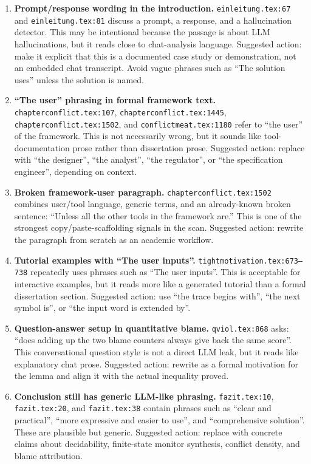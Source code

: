 \documentclass[11pt,a4paper]{article}
\newcommand{\loc}[1]{\texttt{#1}}
\newcommand{\sev}[1]{\textbf{#1}}
\begin{document}
\begin{enumerate}
  \item \sev{Prompt/response wording in the introduction.}
  \loc{einleitung.tex:67} and \loc{einleitung.tex:81} discuss a prompt, a response,
  and a hallucination detector. This may be intentional because the passage is
  about LLM hallucinations, but it reads close to chat-analysis language.
  Suggested action: make it explicit that this is a documented case study or
  demonstration, not an embedded chat transcript. Avoid vague phrases such as
  ``The solution uses'' unless the solution is named.

  \item \sev{``The user'' phrasing in formal framework text.}
  \loc{chapterconflict.tex:107}, \loc{chapterconflict.tex:1445},
  \loc{chapterconflict.tex:1502}, and \loc{conflictmeat.tex:1180} refer to
  ``the user'' of the framework. This is not necessarily wrong, but it sounds like
  tool-documentation prose rather than dissertation prose.
  Suggested action: replace with ``the designer'', ``the analyst'', ``the regulator'',
  or ``the specification engineer'', depending on context.

  \item \sev{Broken framework-user paragraph.}
  \loc{chapterconflict.tex:1502} combines user/tool language, generic terms, and
  an already-known broken sentence: ``Unless all the other tools in the framework
  are.'' This is one of the strongest copy/paste-scaffolding signals in the scan.
  Suggested action: rewrite the paragraph from scratch as an academic workflow.

  \item \sev{Tutorial examples with ``The user inputs''.}
  \loc{tightmotivation.tex:673--738} repeatedly uses phrases such as
  ``The user inputs''. This is acceptable for interactive examples, but it reads
  more like a generated tutorial than a formal dissertation section.
  Suggested action: use ``the trace begins with'', ``the next symbol is'', or
  ``the input word is extended by''.

  \item \sev{Question-answer setup in quantitative blame.}
  \loc{qviol.tex:868} asks: ``does adding up the two blame counters always give
  back the same score''. This conversational question style is not a direct LLM
  leak, but it reads like explanatory chat prose.
  Suggested action: rewrite as a formal motivation for the lemma and align it
  with the actual inequality proved.

  \item \sev{Conclusion still has generic LLM-like phrasing.}
  \loc{fazit.tex:10}, \loc{fazit.tex:20}, and \loc{fazit.tex:38} contain phrases
  such as ``clear and practical'', ``more expressive and easier to use'', and
  ``comprehensive solution''. These are plausible but generic.
  Suggested action: replace with concrete claims about decidability, finite-state
  monitor synthesis, conflict density, and blame attribution.
\end{enumerate}
\end{document}
